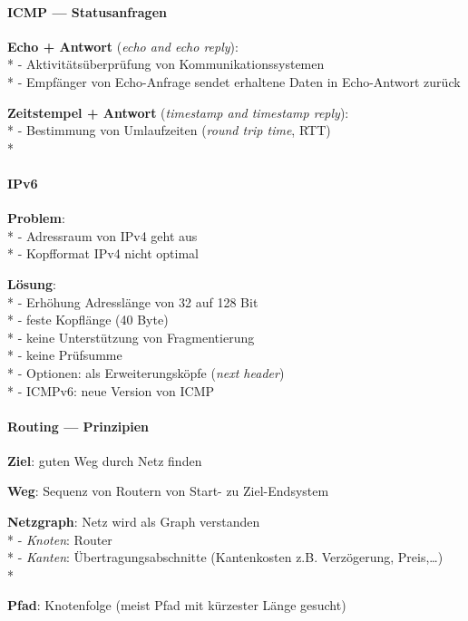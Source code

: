 \paragraph{ICMP --- Statusanfragen}
\begin{items}
  \item \textbf{Echo + Antwort} (\emph{echo and echo reply}): \\*
    - Aktivitätsüberprüfung von Kommunikationssystemen \\*
    - Empfänger von Echo-Anfrage sendet erhaltene Daten in Echo-Antwort zurück
  \item \textbf{Zeitstempel + Antwort} (\emph{timestamp and timestamp reply}): \\*
    - Bestimmung von Umlaufzeiten (\emph{round trip time}, RTT) \\*
\end{items}

\paragraph{IPv6}
\begin{items}
  \item \textbf{Problem}: \\*
    - Adressraum von IPv4 geht aus \\*
    - Kopfformat IPv4 nicht optimal
  \item \textbf{Lösung}: \\*
    - Erhöhung Adresslänge von 32 auf 128 Bit \\*
    - feste Kopflänge (40 Byte) \\*
    - keine Unterstützung von Fragmentierung \\*
    - keine Prüfsumme \\*
    - Optionen: als Erweiterungsköpfe (\emph{next header}) \\*
    - ICMPv6: neue Version von ICMP
\end{items}

\paragraph{Routing --- Prinzipien}
\begin{items}
  \item \textbf{Ziel}: guten Weg durch Netz finden
  \item \textbf{Weg}: Sequenz von Routern von Start- zu Ziel-Endsystem
  \item \textbf{Netzgraph}: Netz wird als Graph verstanden \\*
    - \emph{Knoten}: Router \\*
    - \emph{Kanten}: Übertragungsabschnitte (Kantenkosten z.B. Verzögerung, Preis,\dots) \\*
  \item \textbf{Pfad}: Knotenfolge (meist Pfad mit kürzester Länge gesucht)
\end{items}

